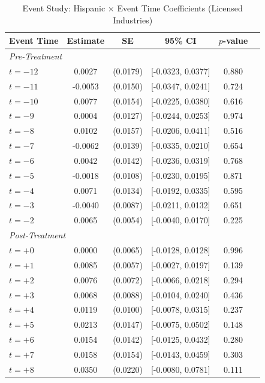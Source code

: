 \begin{table}[H]
\centering
\caption{Event Study: Hispanic $\times$ Event Time Coefficients (Licensed Industries)}
\label{tab:eventstudy}
\begin{threeparttable}
\begin{tabular}{lccccc}
\toprule
Event Time & Estimate & SE & 95\% CI & $p$-value \\
\midrule
\multicolumn{5}{l}{\textit{Pre-Treatment}} \\
$t = -12$ & 0.0027 & (0.0179) & [-0.0323, 0.0377] & 0.880 \\
$t = -11$ & -0.0053 & (0.0150) & [-0.0347, 0.0241] & 0.724 \\
$t = -10$ & 0.0077 & (0.0154) & [-0.0225, 0.0380] & 0.616 \\
$t = -9$ & 0.0004 & (0.0127) & [-0.0244, 0.0253] & 0.974 \\
$t = -8$ & 0.0102 & (0.0157) & [-0.0206, 0.0411] & 0.516 \\
$t = -7$ & -0.0062 & (0.0139) & [-0.0335, 0.0210] & 0.654 \\
$t = -6$ & 0.0042 & (0.0142) & [-0.0236, 0.0319] & 0.768 \\
$t = -5$ & -0.0018 & (0.0108) & [-0.0230, 0.0195] & 0.871 \\
$t = -4$ & 0.0071 & (0.0134) & [-0.0192, 0.0335] & 0.595 \\
$t = -3$ & -0.0040 & (0.0087) & [-0.0211, 0.0132] & 0.651 \\
$t = -2$ & 0.0065 & (0.0054) & [-0.0040, 0.0170] & 0.225 \\
\midrule
\multicolumn{5}{l}{\textit{Post-Treatment}} \\
$t = +0$ & 0.0000 & (0.0065) & [-0.0128, 0.0128] & 0.996 \\
$t = +1$ & 0.0085 & (0.0057) & [-0.0027, 0.0197] & 0.139 \\
$t = +2$ & 0.0076 & (0.0072) & [-0.0066, 0.0218] & 0.294 \\
$t = +3$ & 0.0068 & (0.0088) & [-0.0104, 0.0240] & 0.436 \\
$t = +4$ & 0.0119 & (0.0100) & [-0.0078, 0.0315] & 0.237 \\
$t = +5$ & 0.0213 & (0.0147) & [-0.0075, 0.0502] & 0.148 \\
$t = +6$ & 0.0154 & (0.0142) & [-0.0125, 0.0432] & 0.280 \\
$t = +7$ & 0.0158 & (0.0154) & [-0.0143, 0.0459] & 0.303 \\
$t = +8$ & 0.0350 & (0.0220) & [-0.0080, 0.0781] & 0.111 \\

\end{tabular}
\end{threeparttable}
\end{table}
